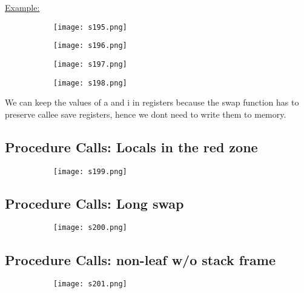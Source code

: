 \documentclass[8pt]{extreport}
\begin{document}
\underline{Example:}
\begin{figure}[H]
\centering
\begin{subfigure}[b]{0.4\linewidth}
\texttt{[image: s195.png]}
\end{subfigure}
\begin{subfigure}[b]{0.4\linewidth}
\texttt{[image: s196.png]}
\end{subfigure}
\begin{subfigure}[b]{0.4\linewidth}
\texttt{[image: s197.png]}
\end{subfigure}
\begin{subfigure}[b]{0.4\linewidth}
\texttt{[image: s198.png]}
\end{subfigure}
\end{figure}
We can keep the values of a and i in registers because the swap function has to preserve callee save registers, hence we dont need to write them to memory.

\subsection{Procedure Calls: Locals in the red zone}
\begin{figure}[H]
\centering
\begin{subfigure}[b]{0.4\linewidth}
\texttt{[image: s199.png]}
\end{subfigure}
\end{figure}
\subsection{Procedure Calls: Long swap}
\begin{figure}[H]
\centering
\begin{subfigure}[b]{0.4\linewidth}
\texttt{[image: s200.png]}
\end{subfigure}
\end{figure}
\subsection{Procedure Calls: non-leaf w/o stack frame}
\begin{figure}[H]
\centering
\begin{subfigure}[b]{0.4\linewidth}
\texttt{[image: s201.png]}
\end{subfigure}
\end{figure}
\end{document}

